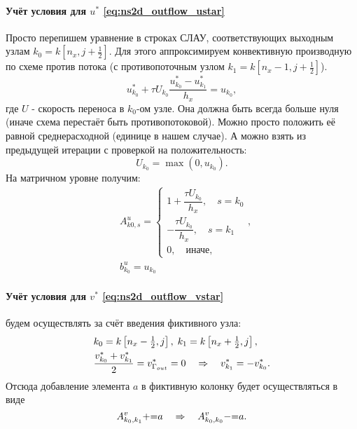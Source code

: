 \paragraph{Учёт условия для $u^*$ \cref{eq:ns2d_outflow_ustar}}
Просто перепишем уравнение в строках СЛАУ, соответствующих выходным узлам $k_0 = k\left[n_x, j+\tfrac12\right]$.
Для этого аппроксимируем конвективную производную по схеме против потока (с противопоточным узлом
$k_1 = k\left[n_x-1, j+\tfrac12\right]$).
$$
u^*_{k_0} + \tau U_{k_0} \frac{u^*_{k_0} - u^*_{k_1}}{h_x} = u_{k_0},
$$
где $U$ - скорость переноса в $k_0$-ом узле. Она должна быть всегда больше нуля (иначе схема
перестаёт быть противопотоковой). Можно просто положить её равной среднерасходной (единице в нашем случае).
А можно взять из предыдущей итерации с проверкой на положительность:
$$
U_{k_0} = \max\left(0, u_{k_0}\right).
$$
На матричном уровне получим:
\begin{equation}
\label{eq:ns2d_outflow_ustar_mat}
\begin{aligned}
&A^u_{k0, s} = \begin{cases}
	1 + \dfrac{\tau U_{k_0}}{h_x}, \quad s = k_0\\[10pt]
	-\dfrac{\tau U_{k_0}}{h_x}, \quad s = k_1\\[10pt]
	0, \quad \text{иначе},
\end{cases}, \\
&b^u_{k_0} = u_{k_0}
\end{aligned}
\end{equation}

\paragraph{Учёт условия для $v^*$ \cref{eq:ns2d_outflow_vstar}}
будем осуществлять за счёт введения фиктивного узла:
\begin{align*}
&k_0 = k\left[n_x - \tfrac12, j\right], \; k_1 = k\left[n_x + \tfrac12, j\right], \\
&\frac{v^*_{k_0} + v^*_{k_1}}{2} = v^*_{\Gamma_{out}} = 0 \quad\Rightarrow\quad v^*_{k_1} = -v^*_{k_0}.
\end{align*}
Отсюда добавление элемента $a$ в фиктивную колонку будет осуществляться в виде
$$
A^v_{k_0, k_1} {{+}{=}} a \quad\Rightarrow\quad A^v_{k_0, k_0} {{-}{=}} a.
$$


